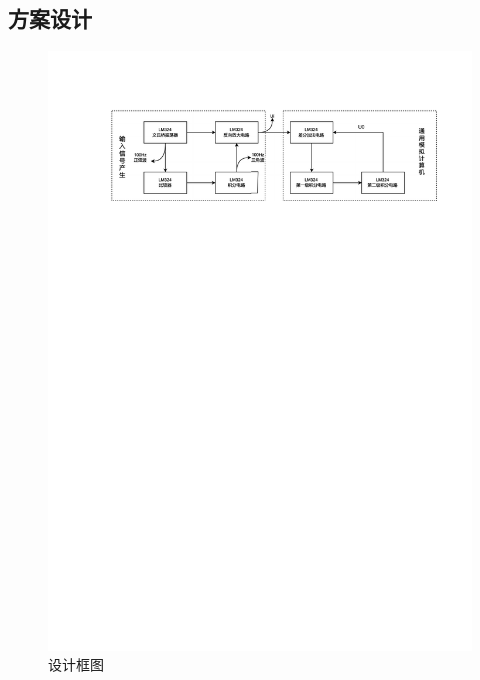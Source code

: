 \documentclass[a4paper]{article}
\theoremstyle{definition}
\theoremstyle{plain}
\theoremstyle{remark}
\begin{document}
\subsection{方案设计}
\vspace*{-2em}
\begin{figure}[H]
	\centering
	\includegraphics[width=1\textwidth]{方案设计框图}
	\caption{设计框图}
\end{figure}
\end{document}
